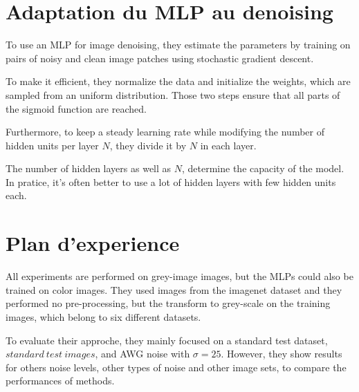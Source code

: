 \documentclass[10pt,a4paper]{article}
\newcommand{\svs}{\vspace{9pt}}
\begin{document}
\section{Adaptation du MLP au denoising}


To use an MLP for image denoising, they estimate the parameters by training on pairs of noisy and clean image patches using stochastic gradient descent. 


\svs

To make it efficient, they normalize the data and initialize the weights, which are sampled from an uniform distribution. Those two steps ensure that all parts of the sigmoid function are reached.

\svs

Furthermore, to keep a steady learning rate while modifying the number of hidden units per layer $N$, they divide it by $N$ in each layer.

\svs

The number of hidden layers as well as $N$, determine the capacity of the model. In pratice, it's often better to use a lot of hidden layers with few hidden units each.

\svs

\section{Plan d'experience}

All experiments are performed on grey-image images, but the MLPs could also be trained on color images. They used images from the imagenet dataset and they performed no pre-processing, but the transform to grey-scale on the training images, which belong to six different datasets.

\svs 

To evaluate their approche, they mainly focused on a standard test dataset, $standard\ test\ images$, and AWG noise with $\sigma=25$. However, they show results for others noise levels, other types of noise and other image sets, to compare the performances of methods.




\printbibliography
\end{document}
